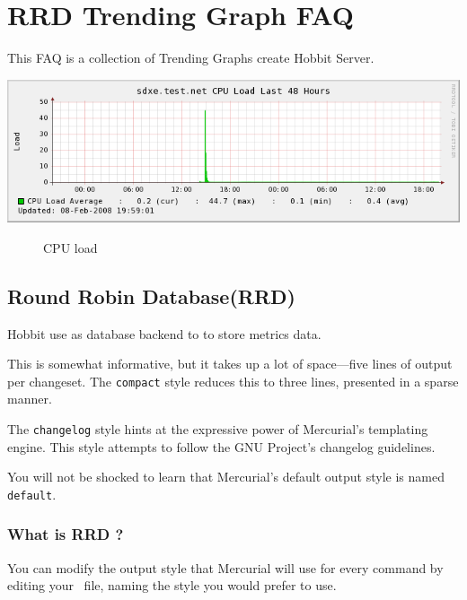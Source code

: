 \chapter{RRD Trending Graph FAQ}
\label{chap:hobbitgraph}


This FAQ is a collection of Trending Graphs create Hobbit Server.

\includegraphics[scale=0.6]{./hobbitgraph.png} 


\begin{figure}[htb]
  \centering
  \caption{CPU load }
  \label{fig:cpu:load}
\end{figure}


\section{Round Robin Database(RRD) }
\label{sec:style}

Hobbit use  as database backend to to store metrics data.



This is somewhat informative, but it takes up a lot of space---five
lines of output per changeset.  The \texttt{compact} style reduces
this to three lines, presented in a sparse manner.


The \texttt{changelog} style hints at the expressive power of
Mercurial's templating engine.  This style attempts to follow the GNU
Project's changelog guidelines\cite{web:changelog}.


You will not be shocked to learn that Mercurial's default output style
is named \texttt{default}.

\subsection{What is RRD ?}

You can modify the output style that Mercurial will use for every
command by editing your \hgrc\ file, naming the style you would
prefer to use.

